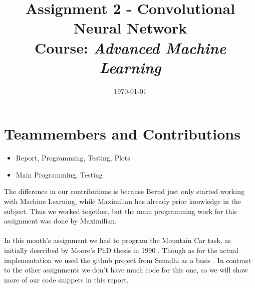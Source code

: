 \documentclass{article}
\title{Assignment 2 - Convolutional Neural Network\\
		{\large Course: \textit{Advanced Machine Learning}}}
\date{\today}
\begin{document}
	
	\maketitle
	
	\section{Teammembers and Contributions}
	\label{sec:TeammembersAndContributions}
	
	\begin{itemize}
		\item {} Report, Programming, Testing, Plots
		\item {} Main Programming, Testing
	\end{itemize}
	
	\noindent The difference in our contributions is because Bernd just only started working with Machine Learning, while Maximilian has already prior knowledge in the subject. Thus we worked together, but the main programming work for this assignment was done by Maximilian. \\
	\\
	In this month's assignment we had to program the Mountain Car task, as initially described by Moore's PhD thesis in 1990 \cite{Moore90efficientmemory-based}. Though as for the actual implementation we used the github project from Senadhi as a basis \cite{MountainCar-v02018}. In contrast to the other assignments we don't have much code for this one, so we will show more of our code snippets in this report. 
	
	
\end{document}
